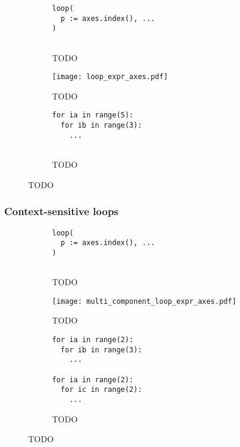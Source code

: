 \documentclass[thesis]{subfiles}
\begin{document}
\begin{figure}[h]
  \centering

  \begin{subfigure}[t]{.32\textwidth}
    \centering
    \begin{verbatim}
loop(
  p := axes.index(), ...
)


    \end{verbatim}
    \caption{TODO}
    \label{fig:loop_expr_init}
  \end{subfigure}
  \begin{subfigure}[t]{.32\textwidth}
    \centering
    \texttt{[image: loop\_expr\_axes.pdf]}
    \caption{TODO}
    \label{fig:loop_expr_axes}
  \end{subfigure}
  \begin{subfigure}[t]{.32\textwidth}
    \centering
    \begin{verbatim}
for ia in range(5):
  for ib in range(3):
    ...


    \end{verbatim}
    \caption{TODO}
    \label{fig:loop_expr_codegen}
  \end{subfigure}

  \caption{TODO}
  \label{fig:loop_expr}
\end{figure}

\subsubsection{Context-sensitive loops}

\begin{figure}[h]
  \centering

  \begin{subfigure}[t]{.32\textwidth}
    \centering
    \begin{verbatim}
loop(
  p := axes.index(), ...
)


    \end{verbatim}
    \caption{TODO}
    \label{fig:multi_component_loop_expr_init}
  \end{subfigure}
  \begin{subfigure}[t]{.32\textwidth}
    \centering
    \texttt{[image: multi\_component\_loop\_expr\_axes.pdf]}
    \caption{TODO}
    \label{fig:multi_component_loop_expr_axes}
  \end{subfigure}
  \begin{subfigure}[t]{.32\textwidth}
    \centering
    \begin{verbatim}
for ia in range(2):
  for ib in range(3):
    ...

for ia in range(2):
  for ic in range(2):
    ...
    \end{verbatim}
    \caption{TODO}
    \label{fig:multi_component_loop_expr_codegen}
  \end{subfigure}

  \caption{TODO}
  \label{fig:multi_component_loop_expr}
\end{figure}
\end{document}
